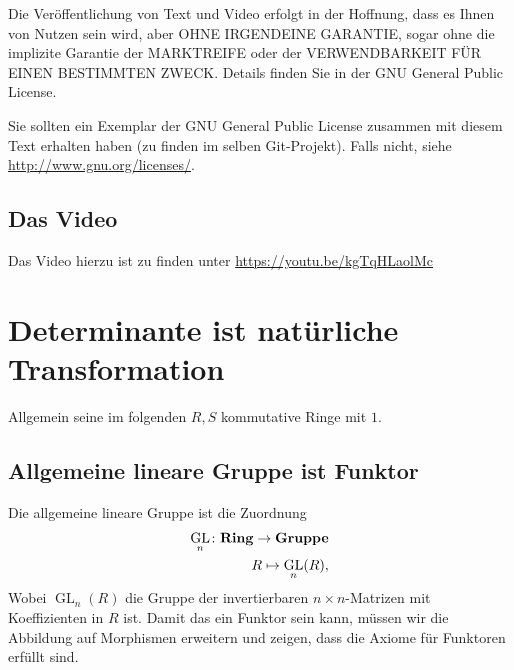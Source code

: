 \documentclass[a4paper]{amsart}
\theoremstyle{definition}
\DeclareMathOperator{\GL}{GL}
\begin{document}
Die Veröffentlichung von Text und Video erfolgt in der Hoffnung, dass es Ihnen von Nutzen sein wird, 
aber OHNE IRGENDEINE GARANTIE, sogar ohne die implizite Garantie der MARKTREIFE oder der 
VERWENDBARKEIT FÜR EINEN BESTIMMTEN ZWECK. Details finden Sie in der GNU General Public License.

Sie sollten ein Exemplar der GNU General Public License zusammen mit diesem Text erhalten haben 
(zu finden im selben Git-Projekt). 
Falls nicht, siehe \url{http://www.gnu.org/licenses/}.

\subsection*{Das Video}
Das Video hierzu ist zu finden unter 
{\tiny
   \url{https://youtu.be/kgTqHLaolMc}
}

\section{Determinante ist natürliche Transformation}
Allgemein seine im folgenden $R, S$ kommutative Ringe mit $1$.

\subsection{Allgemeine lineare Gruppe ist Funktor}
Die allgemeine lineare Gruppe ist die Zuordnung
\begin{align}
   \GL_n \colon \text{\textbf{Ring}} \to \text{\textbf{Gruppe}}\\
   R \mapsto \GL_n(R),
\end{align}
Wobei $\GL_n(R)$ die Gruppe der invertierbaren $n \times n$-Matrizen mit Koeffizienten in $R$ ist.
Damit das ein Funktor sein kann, müssen wir die Abbildung auf Morphismen erweitern und zeigen, dass die Axiome für Funktoren erfüllt sind.
\end{document}
